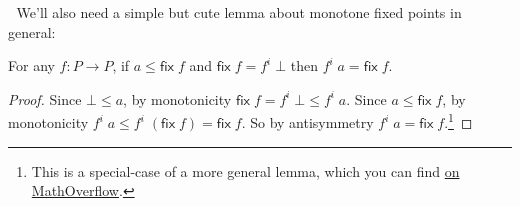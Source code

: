\documentclass{rntz}
\newcommand{\ms}[1]{\ensuremath{\mathsf{#1}}}
\newcommand{\fix}{\ms{fix}}
\newcommand{\dv}{\delta}
\begin{document}





We'll also need a simple but cute lemma about monotone fixed points in general:

\begin{lemma} \label{lem:jcreed}
  For any $f : P \to P$, if $a \le \fix\;f$ and $\fix\;f = f^i\;\bot$ then
  $f^i\;a = \fix\;f$.
\end{lemma}
\begin{proof}
  Since $\bot \le a$, by monotonicity $\fix\;f = f^i\;\bot \le f^i\;a$. Since $a
  \le \fix\;f$, by monotonicity $f^i\;a \le f^i\;(\fix\;f) = \fix\;f$. So by
  antisymmetry $f^i\;a = \fix\;f$.\footnote{This is a special-case of a more
    general lemma, which you can find \href{https://mathoverflow.net/questions/269117/random-iteration-of-a-set-of-monotone-maps-until-fixed-point}{on MathOverflow}.}
\end{proof}
\end{document}
